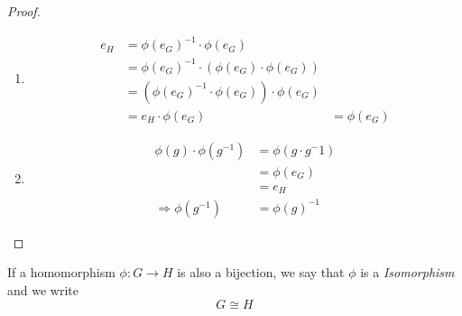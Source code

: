 \documentclass{article}
\begin{document}
\begin{proof}\leavevmode
    \begin{enumerate}
        \item \begin{align*}
            e_H &= \phi(e_G)^{-1} \cdot \phi(e_G) \\
            &= \phi(e_G)^{-1} \cdot (\phi(e_G) \cdot \phi(e_G)) \tag{homomorphism property}\\
            &= (\phi(e_G)^{-1} \cdot \phi(e_G)) \cdot \phi(e_G) \\
            &= e_H \cdot \phi(e_G)
            &= \phi(e_G)
        \end{align*}
        \item \begin{align*}
            \phi(g) \cdot \phi(g^{-1}) &= \phi(g \cdot g^-1) \tag{homomorphism property} \\
            &= \phi(e_G) \\
            &= e_H \\
            \Rightarrow \phi(g^{-1}) &= \phi(g)^{-1}
        \end{align*}
    \end{enumerate}
\end{proof}


\begin{defi}[Isomorphism]
    If a homomorphism $\phi : G \rightarrow H$ is also a bijection, we say that $\phi$ is a \emph{Isomorphism} and we write
    \[
        G \cong H
    \]
\end{defi}
\end{document}
